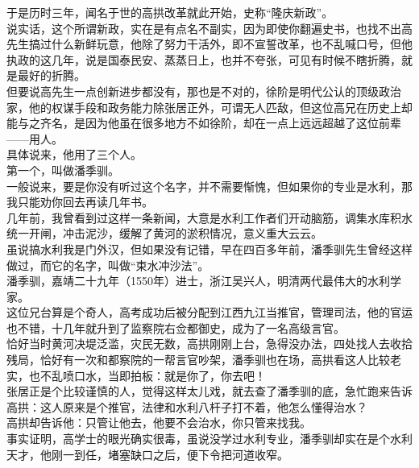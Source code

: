 \begin{multicols}{\theparacolNo}
于是历时三年，闻名于世的高拱改革就此开始，史称“隆庆新政”。\\

说实话，这个所谓新政，实在是有点名不副实，因为即使你翻遍史书，也找不出高先生搞过什么新鲜玩意，他除了努力干活外，即不宣誓改革，也不乱喊口号，但他执政的这几年，说是国泰民安、蒸蒸日上，也并不夸张，可见有时候不瞎折腾，就是最好的折腾。\\

但要说高先生一点创新进步都没有，那也是不对的，徐阶是明代公认的顶级政治家，他的权谋手段和政务能力除张居正外，可谓无人匹敌，但这位高兄在历史上却能与之齐名，是因为他虽在很多地方不如徐阶，却在一点上远远超越了这位前辈——用人。\\

具体说来，他用了三个人。\\

第一个，叫做潘季驯。\\

一般说来，要是你没有听过这个名字，并不需要惭愧，但如果你的专业是水利，那我只能劝你回去再读几年书。\\

几年前，我曾看到过这样一条新闻，大意是水利工作者们开动脑筋，调集水库积水统一开闸，冲击泥沙，缓解了黄河的淤积情况，意义重大云云。\\

虽说搞水利我是门外汉，但如果没有记错，早在四百多年前，潘季驯先生曾经这样做过，而它的名字，叫做“束水冲沙法”。\\

潘季驯，嘉靖二十九年（1550年）进士，浙江吴兴人，明清两代最伟大的水利学家。\\

这位兄台算是个奇人，高考成功后被分配到江西九江当推官，管理司法，他的官运也不错，十几年就升到了监察院右佥都御史，成为了一名高级言官。\\

恰好当时黄河决堤泛滥，灾民无数，高拱刚刚上台，急得没办法，四处找人去收拾残局，恰好有一次和都察院的一帮言官吵架，潘季驯也在场，高拱看这人比较老实，也不乱喷口水，当即拍板：就是你了，你去吧！\\

张居正是个比较谨慎的人，觉得这样太儿戏，就去查了潘季驯的底，急忙跑来告诉高拱：这人原来是个推官，法律和水利八杆子打不着，他怎么懂得治水？\\

高拱却告诉他：只管让他去，他要不会治水，你只管来找我。\\

事实证明，高学士的眼光确实很毒，虽说没学过水利专业，潘季驯却实在是个水利天才，他刚一到任，堵塞缺口之后，便下令把河道收窄。\\


\end{multicols}
